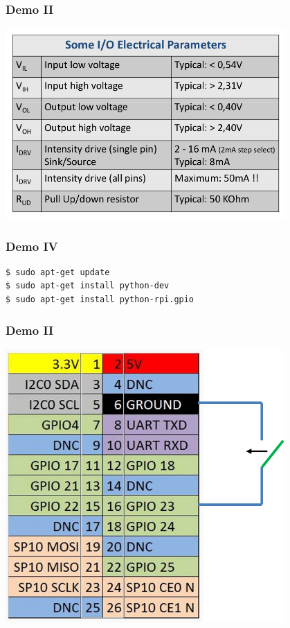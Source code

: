\documentclass[10pt,colorlinks]{beamer}
\begin{document}
\begin{frame}[fragile]\frametitle{Demo II}
\begin{center}
   \includegraphics[width=0.8\textwidth]{figs/pin4} 
\end{center}
\end{frame}


\begin{frame}[fragile]\frametitle{Demo IV}

\begin{verbatim}
$ sudo apt-get update
$ sudo apt-get install python-dev
$ sudo apt-get install python-rpi.gpio    
\end{verbatim}
\end{frame}



\begin{frame}[fragile]\frametitle{Demo II}
\begin{center}
   \includegraphics[width=0.8\textwidth]{figs/pin5} 
\end{center}
\end{frame}
\end{document}
